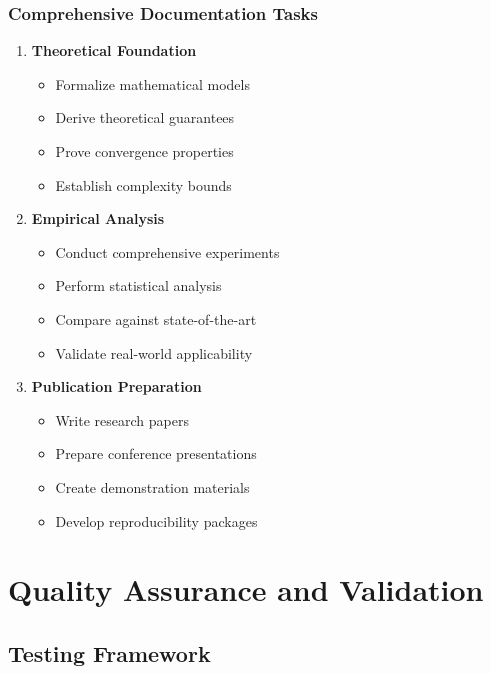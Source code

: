 \documentclass[12pt,a4paper]{article}
\begin{document}
\subsubsection{Comprehensive Documentation Tasks}
\begin{enumerate}
    \item \textbf{Theoretical Foundation}
    \begin{itemize}
        \item Formalize mathematical models
        \item Derive theoretical guarantees
        \item Prove convergence properties
        \item Establish complexity bounds
    \end{itemize}
    
    \item \textbf{Empirical Analysis}
    \begin{itemize}
        \item Conduct comprehensive experiments
        \item Perform statistical analysis
        \item Compare against state-of-the-art
        \item Validate real-world applicability
    \end{itemize}
    
    \item \textbf{Publication Preparation}
    \begin{itemize}
        \item Write research papers
        \item Prepare conference presentations
        \item Create demonstration materials
        \item Develop reproducibility packages
    \end{itemize}
\end{enumerate}

\section{Quality Assurance and Validation}

\subsection{Testing Framework}
\end{document}
